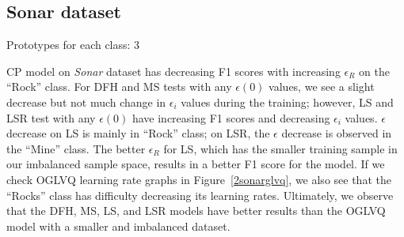 \subsection{Sonar dataset}

Prototypes for each class: 3
\vspace{5pt}

CP model on \textit{Sonar} dataset has decreasing F1 scores with increasing $\epsilon_{R}$ on the “Rock” class. For DFH and MS tests with any $\epsilon(0)$ values, we see a slight decrease but not much change in $\epsilon_{i}$ values during the training; however, LS and LSR test with any $\epsilon(0)$ have increasing F1 scores and decreasing $\epsilon_{i}$ values. $\epsilon$ decrease on LS is mainly in “Rock” class; on LSR, the $\epsilon$ decrease is observed in the “Mine” class. The better $\epsilon_{R}$ for LS, which has the smaller training sample in our imbalanced sample space, results in a better F1 score for the model. If we check OGLVQ learning rate graphs in Figure~\ref{2sonarglvq}, we also see that the “Rocks” class has difficulty decreasing its learning rates. Ultimately, we observe that the DFH, MS, LS, and LSR models have better results than the OGLVQ model with a smaller and imbalanced dataset.



